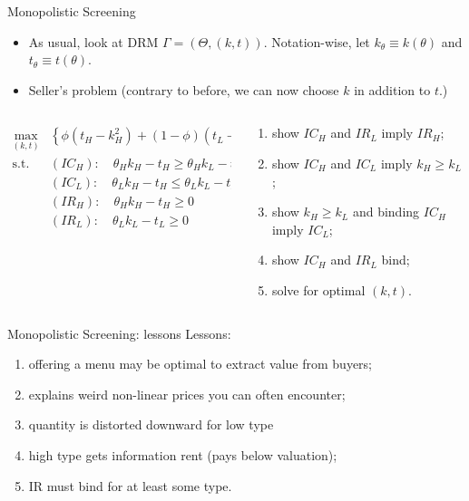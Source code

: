 \documentclass[english,10pt
,aspectratio=169
]{beamer}
\begin{document}
\begin{frame}{Monopolistic Screening}
\begin{itemize}
	\item As usual, look at DRM $\Gamma = (\Theta, (k,t))$. Notation-wise, let $k_\theta \equiv k(\theta)$ and $t_\theta \equiv t(\theta)$.
	\item Seller's problem (contrary to before, we can now choose $k$ in addition to $t$.)
\end{itemize}

\begin{columns}
	\begin{column}{0.5\linewidth}
		\begin{align*}
			\max_{(k,t)} & \left\{ \phi (t_H - k_H^2) + (1-\phi) (t_L - k_L^2) \right\}
			\\ \text{s.t. } & (IC_H):\quad \theta_H k_H - t_H \geq \theta_H k_L - t_L
			\\ & (IC_L):\quad \theta_L k_H - t_H \leq \theta_L k_L - t_L
			\\ & (IR_H):\quad \theta_H k_H - t_H \geq 0
			\\ & (IR_L):\quad \theta_L k_L - t_L \geq 0
		\end{align*}
	\end{column}
	\begin{column}{0.5\linewidth}
		\begin{enumerate}[<+->]
			\item show $IC_H$ and $IR_L$ imply $IR_H$;
			\item show $IC_H$ and $IC_L$ imply $k_H \geq k_L$;
			\item show $k_H \geq k_L$ and binding $IC_H$ imply $IC_L$;
			\item show $IC_H$ and $IR_L$ bind;
			\item solve for optimal $(k,t)$.
		\end{enumerate}
	\end{column}
\end{columns}



\end{frame}


\begin{frame}{Monopolistic Screening: lessons}
Lessons:
	\begin{enumerate}[<+->]
		\item offering a menu may be optimal to extract value from buyers;
		\item explains weird non-linear prices you can often encounter; %
		\item quantity is distorted downward for low type
		\item high type gets information rent (pays below valuation);
		\item IR must bind for at least some type.
	\end{enumerate}
\end{frame}
\end{document}
